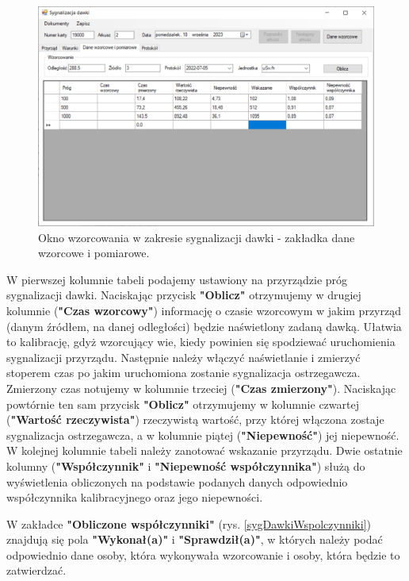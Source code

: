 	\begin{figure}[htb]
		\centering
		\includegraphics[width=\columnwidth]{obrazki/Wzorcowanie/syg_dawki/dane.png}
		\caption{Okno wzorcowania w zakresie sygnalizacji dawki - zakładka dane wzorcowe i pomiarowe.}
		\label{sygDawkiDane}
	\end{figure}
	
	W pierwszej kolumnie tabeli podajemy ustawiony na przyrządzie próg sygnalizacji dawki. Naciskając przycisk \textbf{"Oblicz"} otrzymujemy w drugiej kolumnie (\textbf{"Czas wzorcowy"}) informację o czasie wzorcowym w jakim przyrząd (danym źródłem, na danej odległości) będzie naświetlony zadaną dawką. Ułatwia to kalibrację, gdyż wzorcujący wie, kiedy powinien się spodziewać uruchomienia sygnalizacji przyrządu. Następnie należy włączyć naświetlanie i zmierzyć stoperem czas po jakim uruchomiona zostanie sygnalizacja ostrzegawcza. Zmierzony czas notujemy w kolumnie trzeciej (\textbf{"Czas zmierzony"}). Naciskając powtórnie ten sam przycisk \textbf{"Oblicz"} otrzymujemy w kolumnie czwartej (\textbf{"Wartość rzeczywista"}) rzeczywistą wartość, przy której włączona zostaje sygnalizacja ostrzegawcza, a w kolumnie piątej (\textbf{"Niepewność"}) jej niepewność. W kolejnej kolumnie tabeli należy zanotować wskazanie przyrządu. Dwie ostatnie kolumny (\textbf{"Współczynnik"} i \textbf{"Niepewność współczynnika"}) służą do wyświetlenia obliczonych na podstawie podanych danych odpowiednio współczynnika kalibracyjnego oraz jego niepewności.
	
	W zakładce \textbf{"Obliczone współczynniki"} (rys. \ref{sygDawkiWspolczynniki}) znajdują się pola \textbf{"Wykonał(a)"} i \textbf{"Sprawdził(a)"}, w których należy podać odpowiednio dane osoby, która wykonywała wzorcowanie i osoby, która będzie to zatwierdzać. 
	
